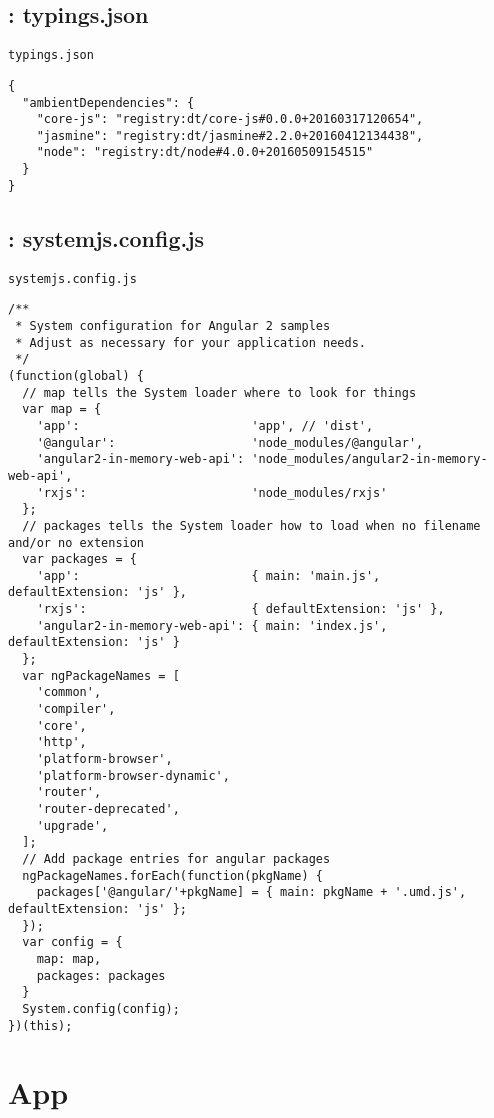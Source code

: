 \documentclass[11pt]{article}
\begin{document}
\subsection{: typings.json}
\label{sec-1-3}
\begin{verbatim}
typings.json
\end{verbatim}
\begin{verbatim}
{
  "ambientDependencies": {
    "core-js": "registry:dt/core-js#0.0.0+20160317120654",
    "jasmine": "registry:dt/jasmine#2.2.0+20160412134438",
    "node": "registry:dt/node#4.0.0+20160509154515"
  }
}
\end{verbatim}

\subsection{: systemjs.config.js}
\label{sec-1-4}
\begin{verbatim}
systemjs.config.js
\end{verbatim}
\begin{verbatim}
/**
 * System configuration for Angular 2 samples
 * Adjust as necessary for your application needs.
 */
(function(global) {
  // map tells the System loader where to look for things
  var map = {
    'app':                        'app', // 'dist',
    '@angular':                   'node_modules/@angular',
    'angular2-in-memory-web-api': 'node_modules/angular2-in-memory-web-api',
    'rxjs':                       'node_modules/rxjs'
  };
  // packages tells the System loader how to load when no filename and/or no extension
  var packages = {
    'app':                        { main: 'main.js',  defaultExtension: 'js' },
    'rxjs':                       { defaultExtension: 'js' },
    'angular2-in-memory-web-api': { main: 'index.js', defaultExtension: 'js' }
  };
  var ngPackageNames = [
    'common',
    'compiler',
    'core',
    'http',
    'platform-browser',
    'platform-browser-dynamic',
    'router',
    'router-deprecated',
    'upgrade',
  ];
  // Add package entries for angular packages
  ngPackageNames.forEach(function(pkgName) {
    packages['@angular/'+pkgName] = { main: pkgName + '.umd.js', defaultExtension: 'js' };
  });
  var config = {
    map: map,
    packages: packages
  }
  System.config(config);
})(this);
\end{verbatim}

\section{App}
\label{sec-2}
\end{document}
